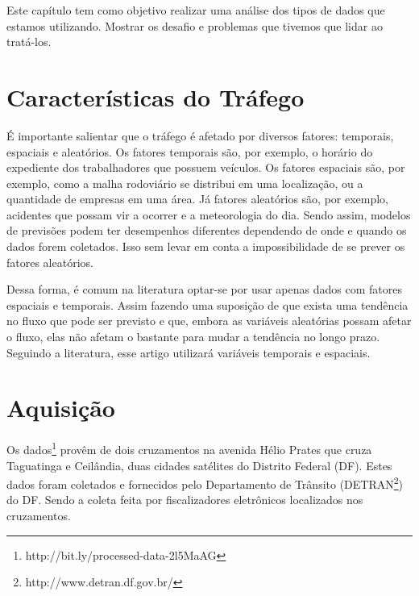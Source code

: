 





Este capítulo tem como objetivo realizar uma análise dos tipos de dados que estamos utilizando. Mostrar os desafio e problemas que tivemos que lidar ao tratá-los.

\section{Características do Tráfego}

É importante salientar que o tráfego é afetado por diversos fatores: temporais, espaciais e aleatórios. Os fatores temporais são, por exemplo, o horário do expediente dos trabalhadores que possuem veículos. Os fatores espaciais são, por exemplo, como a malha rodoviário se distribui em uma localização, ou a quantidade de empresas em uma área. Já fatores aleatórios são, por exemplo, acidentes que possam vir a ocorrer e a meteorologia do dia. Sendo assim, modelos de previsões podem ter desempenhos diferentes dependendo de onde e quando os dados forem coletados. Isso sem levar em conta a impossibilidade de se prever os fatores aleatórios.

Dessa forma, é comum na literatura optar-se por usar apenas dados com fatores espaciais e temporais. Assim fazendo uma suposição de que exista uma tendência no fluxo que pode ser previsto e que, embora as variáveis aleatórias possam afetar o fluxo, elas não afetam o bastante para mudar a tendência no longo prazo. Seguindo a literatura, esse artigo utilizará variáveis temporais e espaciais.


\section{Aquisição}

Os dados\footnote{http://bit.ly/processed-data-2l5MaAG} provêm de dois cruzamentos na avenida Hélio Prates que cruza Taguatinga e Ceilândia, duas cidades satélites do Distrito Federal (DF). Estes dados foram coletados e fornecidos pelo Departamento de Trânsito (\acrfull{DETRAN}\footnote{http://www.detran.df.gov.br/}) do \acrfull{DF}. Sendo a coleta feita por fiscalizadores eletrônicos localizados nos cruzamentos.

